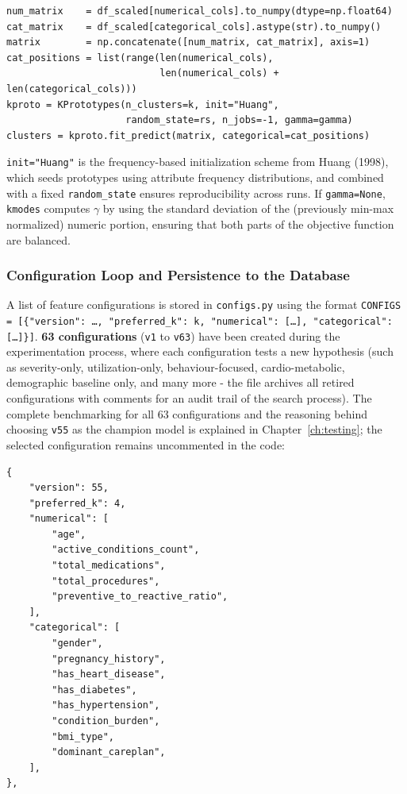 \begin{lstlisting}[style=pythonstyle]
num_matrix    = df_scaled[numerical_cols].to_numpy(dtype=np.float64)
cat_matrix    = df_scaled[categorical_cols].astype(str).to_numpy()
matrix        = np.concatenate([num_matrix, cat_matrix], axis=1)
cat_positions = list(range(len(numerical_cols),
                           len(numerical_cols) + len(categorical_cols)))
kproto = KPrototypes(n_clusters=k, init="Huang",
                     random_state=rs, n_jobs=-1, gamma=gamma)
clusters = kproto.fit_predict(matrix, categorical=cat_positions)
\end{lstlisting}

\texttt{init="Huang"} is the frequency-based initialization scheme from Huang (1998), which seeds prototypes using attribute frequency distributions, and combined with a fixed \texttt{random\_state} ensures reproducibility across runs. If \texttt{gamma=None}, \texttt{kmodes} computes \(\gamma\) by using the standard deviation of the (previously min-max normalized) numeric portion, ensuring that both parts of the objective function are balanced.

\subsubsection*{Configuration Loop and Persistence to the Database}

A list of feature configurations is stored in \texttt{configs.py} using the format \texttt{CONFIGS = [\{"version": \dots, \allowbreak "preferred\_\allowbreak k": k, \allowbreak "numerical": [\dots], \allowbreak "categorical": [\dots]\}]}. \textbf{63 configurations} (\texttt{v1} to \texttt{v63}) have been created during the experimentation process, where each configuration tests a new hypothesis (such as severity-only, utilization-only, behaviour-focused, cardio-metabolic, demographic baseline only, and many more - the file archives all retired configurations with comments for an audit trail of the search process). The complete benchmarking for all 63 configurations and the reasoning behind choosing \texttt{v55} as the champion model is explained in Chapter~\ref{ch:testing}; the selected configuration remains uncommented in the code:

\begin{lstlisting}[style=pythonstyle]
{
    "version": 55,
    "preferred_k": 4,
    "numerical": [
        "age",
        "active_conditions_count",
        "total_medications",
        "total_procedures",
        "preventive_to_reactive_ratio",
    ],
    "categorical": [
        "gender",
        "pregnancy_history",
        "has_heart_disease",
        "has_diabetes",
        "has_hypertension",
        "condition_burden",
        "bmi_type",
        "dominant_careplan",
    ],
},
\end{lstlisting}

